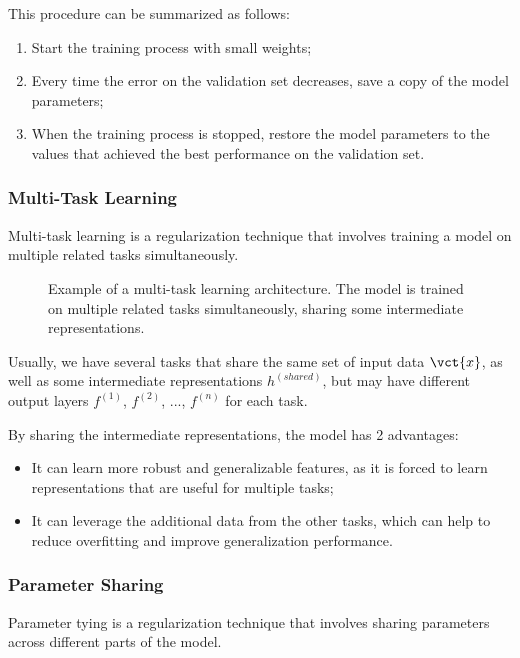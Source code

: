 This procedure can be summarized as follows:
\begin{enumerate}
    \item Start the training process with small weights;
    \item Every time the error on the validation set decreases, save a copy of the model parameters;
    \item When the training process is stopped, restore the model parameters to the values that achieved the best performance on the validation set.
\end{enumerate}

\subsubsection{Multi-Task Learning}
Multi-task learning is a regularization technique that involves training a model on multiple related tasks simultaneously.
\begin{figure}[H]
    \centering
    
    \caption{Example of a multi-task learning architecture. 
    The model is trained on multiple related tasks simultaneously, sharing some intermediate representations.}
    \label{fig:multi-task-learning}
\end{figure}

Usually, we have several tasks that share the same set of input data $\vct{x}$, as well as some intermediate representations $h^{(shared)}$,
but may have different output layers $f^{(1)}$, $f^{(2)}$, ..., $f^{(n)}$ for each task.

By sharing the intermediate representations, the model has 2 advantages:
\begin{itemize}
    \item It can learn more robust and generalizable features, as it is forced to learn representations that are useful for multiple tasks;
    \item It can leverage the additional data from the other tasks, which can help to reduce overfitting and improve generalization performance.
\end{itemize}

\subsubsection{Parameter Sharing}
Parameter tying is a regularization technique that involves sharing parameters across different parts of the model.

